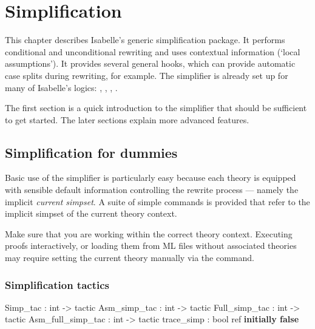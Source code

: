 \chapter{Simplification}
\label{chap:simplification}

This chapter describes Isabelle's generic simplification package.  It
performs conditional and unconditional rewriting and uses contextual
information (`local assumptions').  It provides several general hooks,
which can provide automatic case splits during rewriting, for example.
The simplifier is already set up for many of Isabelle's logics: \FOL,
\ZF, \HOL, \HOLCF.

The first section is a quick introduction to the simplifier that
should be sufficient to get started.  The later sections explain more
advanced features.


\section{Simplification for dummies}
\label{sec:simp-for-dummies}

Basic use of the simplifier is particularly easy because each theory
is equipped with sensible default information controlling the rewrite
process --- namely the implicit {\em current
  simpset}.  A suite of simple commands is
provided that refer to the implicit simpset of the current theory
context.

\begin{warn}
  Make sure that you are working within the correct theory context.
  Executing proofs interactively, or loading them from ML files
  without associated theories may require setting the current theory
  manually via the  command.
\end{warn}

\subsection{Simplification tactics} \label{sec:simp-for-dummies-tacs}
\begin{ttbox}
Simp_tac          : int -> tactic
Asm_simp_tac      : int -> tactic
Full_simp_tac     : int -> tactic
Asm_full_simp_tac : int -> tactic
trace_simp        : bool ref \hfill{\bf initially false}
\end{ttbox}

